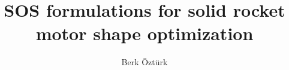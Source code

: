 \documentclass[11pt]{article}
\begin{document}
    \title{SOS formulations for solid rocket motor shape optimization}
    \author{Berk {\"O}zt{\"u}rk}
    \maketitle

    

    

    

    

    

    
    
    

    
\end{document}
